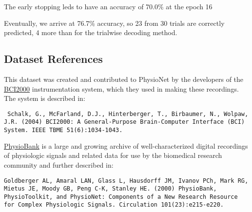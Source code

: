 \documentclass[11pt]{article}
\begin{document}
    The early stopping leds to have an accuracy of 70.0\% at the epoch 16

    Eventually, we arrive at 76.7\% accuracy, so 23 from 30 trials are
correctly predicted, 4 more than for the trialwise decoding method.

    \subsection{Dataset References}\label{dataset-references}

    This dataset was created and contributed to PhysioNet by the developers
of the \href{http://www.schalklab.org/research/bci2000}{BCI2000}
instrumentation system, which they used in making these recordings. The
system is described in:

\begin{verbatim}
 Schalk, G., McFarland, D.J., Hinterberger, T., Birbaumer, N., Wolpaw, J.R. (2004) BCI2000: A General-Purpose Brain-Computer Interface (BCI) System. IEEE TBME 51(6):1034-1043.
\end{verbatim}

\href{https://physionet.org/physiobank/}{PhysioBank} is a large and
growing archive of well-characterized digital recordings of physiologic
signals and related data for use by the biomedical research community
and further described in:

\begin{verbatim}
Goldberger AL, Amaral LAN, Glass L, Hausdorff JM, Ivanov PCh, Mark RG, Mietus JE, Moody GB, Peng C-K, Stanley HE. (2000) PhysioBank, PhysioToolkit, and PhysioNet: Components of a New Research Resource for Complex Physiologic Signals. Circulation 101(23):e215-e220.
\end{verbatim}


    
    
    
    
\end{document}
